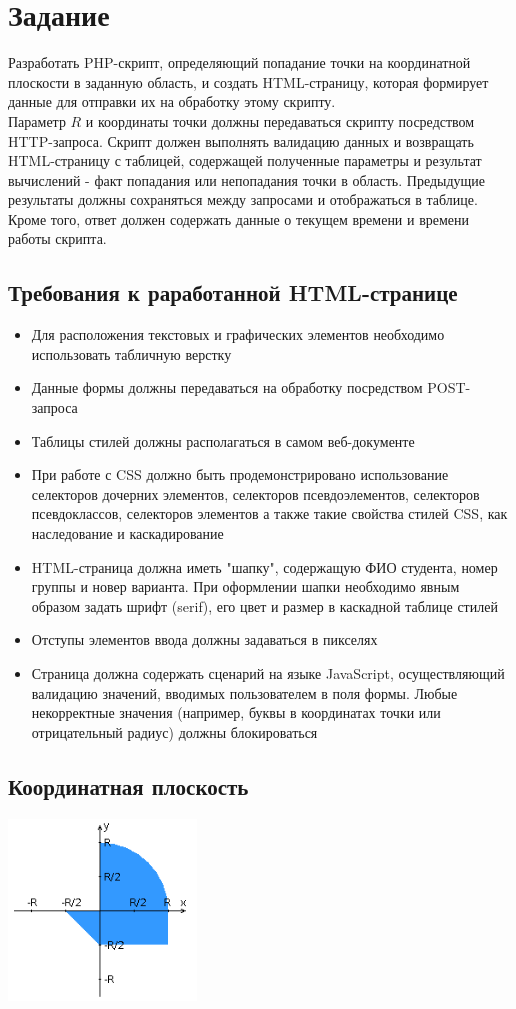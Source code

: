 \documentclass[12pt,a4paper]{report}
\begin{document}
\section*{Задание}
Разработать PHP-скрипт, определяющий попадание точки на координатной плоскости в заданную область, и создать HTML-страницу, которая формирует данные для отправки их на обработку этому скрипту. \\
\hfill\break
Параметр $R$ и координаты точки должны передаваться скрипту посредством HTTP-запроса. Скрипт должен выполнять валидацию данных и возвращать HTML-страницу с таблицей, содержащей полученные параметры и результат вычислений - факт попадания или непопадания точки в область. Предыдущие результаты должны сохраняться между запросами и отображаться в таблице. \\
\hfill\break
Кроме того, ответ должен содержать данные о текущем времени и времени работы скрипта.
\subsection*{Требования к раработанной HTML-странице}
\begin{itemize}
    \item Для расположения текстовых и графических элементов необходимо использовать табличную верстку
    \item Данные формы должны передаваться на обработку посредством POST-запроса
    \item Таблицы стилей должны располагаться в самом веб-документе
    \item При работе с CSS должно быть продемонстрировано использование селекторов дочерних элементов, селекторов псевдоэлементов, селекторов псевдоклассов, селекторов элементов а также такие свойства стилей CSS, как наследование и каскадирование
    \item HTML-страница должна иметь "шапку", содержащую ФИО студента, номер группы и новер варианта. При оформлении шапки необходимо явным образом задать шрифт (serif), его цвет и размер в каскадной таблице стилей
    \item Отступы элементов ввода должны задаваться в пикселях
    \item Страница должна содержать сценарий на языке JavaScript, осуществляющий валидацию значений, вводимых пользователем в поля формы. Любые некорректные значения (например, буквы в координатах точки или отрицательный радиус) должны блокироваться
\end{itemize}
\subsection*{Координатная плоскость}
\begin{center}
    \includegraphics*[width=5cm]{graph.png}
\end{center}
\end{document}
